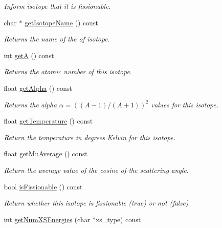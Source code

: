 \begin{DoxyCompactItemize}
\begin{DoxyCompactList}\small\item\em Inform isotope that it is fissionable. \end{DoxyCompactList}\item 
char $\ast$ \hyperlink{classIsotope_a3e2ee2187d8765500876067f184e9958}{get\-Isotope\-Name} () const 
\begin{DoxyCompactList}\small\item\em Returns the name of the of isotope. \end{DoxyCompactList}\item 
int \hyperlink{classIsotope_a147b6797175aebe1971ce959e9fee09f}{get\-A} () const 
\begin{DoxyCompactList}\small\item\em Returns the atomic number of this isotope. \end{DoxyCompactList}\item 
float \hyperlink{classIsotope_ad0003d170a157b0bcbc7577803408f33}{get\-Alpha} () const 
\begin{DoxyCompactList}\small\item\em Returns the alpha $ \alpha = ((A-1)/(A+1))^2 $ values for this isotope. \end{DoxyCompactList}\item 
float \hyperlink{classIsotope_af391a8ae308eddee653ecc9015da607f}{get\-Temperature} () const 
\begin{DoxyCompactList}\small\item\em Return the temperature in degrees Kelvin for this isotope. \end{DoxyCompactList}\item 
float \hyperlink{classIsotope_a9f9a06707126591c5a8e65896bfa3552}{get\-Mu\-Average} () const 
\begin{DoxyCompactList}\small\item\em Return the average value of the cosine of the scattering angle. \end{DoxyCompactList}\item 
bool \hyperlink{classIsotope_aa8b40c46707c5989d4d834b4805e363a}{is\-Fissionable} () const 
\begin{DoxyCompactList}\small\item\em Return whether this isotope is fissionable (true) or not (false) \end{DoxyCompactList}\item 
int \hyperlink{classIsotope_aba83c46d1b7215f8cd0a3c6002e06588}{get\-Num\-X\-S\-Energies} (char $\ast$xs\-\_\-type) const 

\end{DoxyCompactItemize}
